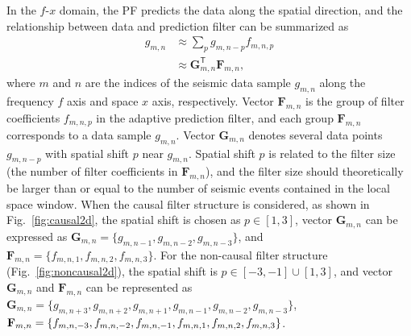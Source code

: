 In the $f$-$x$ domain, the PF predicts the data along the spatial
direction, and the relationship between data and prediction filter can
be summarized as
\begin{equation}
    \label{eq:fxar}
    \begin{aligned}
        g_{m,n}
         & \approx \sum_{p} g_{m,n-p} f_{m,n,p}                    \\
         & \approx \mathbf{G}_{m,n}^{\mathsf{T}} \mathbf{F}_{m,n},
    \end{aligned}
\end{equation}
where $m$ and $n$ are the indices of the seismic data sample $g_{m,n}$
along the frequency $f$ axis and space $x$ axis, respectively.  Vector
$\mathbf{F}_{m,n}$ is the group of filter coefficients $f_{m,n,p}$ in
the adaptive prediction filter, and each group $\mathbf{F}_{m,n}$
corresponds to a data sample $g_{m,n}$.  Vector $\mathbf{G}_{m,n}$
denotes several data points $g_{m,n-p}$ with spatial shift $p$ near
$g_{m,n}$.  Spatial shift $p$ is related to the filter size (the
number of filter coefficients in $\mathbf{F}_{m,n}$), and the filter
size should theoretically be larger than or equal to the number of
seismic events contained in the local space window.  When the causal
filter structure is considered, as shown in Fig.~\ref{fig:causal2d},
the spatial shift is chosen as $ p \in [1, 3] $, vector
$\mathbf{G}_{m,n}$ can be expressed as $ \mathbf{G}_{m,n} = \{
g_{m,n-1}, g_{m,n-2}, g_{m,n-3} \} $, and $ \mathbf{F}_{m,n} = \{
f_{m,n,1}, f_{m,n,2}, f_{m,n,3} \} $.  For the non-causal filter
structure (Fig.~\ref{fig:noncausal2d}), the spatial shift is $ p \in
[-3,-1] \cup [1, 3] $, and vector $\mathbf{G}_{m,n}$ and
$\mathbf{F}_{m,n}$ can be represented as $ \mathbf{G}_{m,n} = \{
g_{m,n+3}, g_{m,n+2}, g_{m,n+1}, g_{m,n-1}, g_{m,n-2}, g_{m,n-3} \} $,
$ \mathbf{F}_{m,n} = \{ f_{m,n,-3}, f_{m,n,-2}, f_{m,n,-1},
f_{m,n,1},\\ f_{m,n,2}, f_{m,n,3} \} $.


